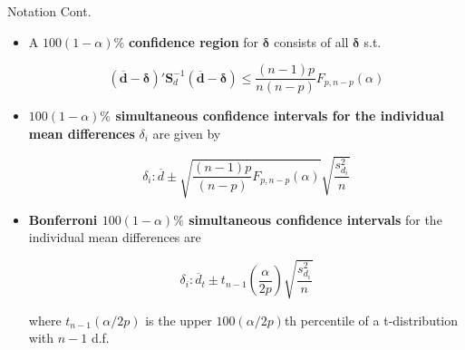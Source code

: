 \documentclass[8pt]{beamer}
\begin{document}
    \begin{frame}{Notation Cont.}
        
        \begin{itemize}
            \item A $100(1 - \alpha)\%$ \textbf{confidence region} for $\mathbf{\delta}$ consists of all $\mathbf{\delta}$ s.t.
            
            \begin{equation}
                (\mathbf{\overline{d}} - \mathbf{\delta})'\mathbf{S}^{-1}_{d}(\overline{\mathbf{d}} - \mathbf{\delta}) \leq \frac{(n - 1)p}{n(n-p)}F_{p,n-p}(\alpha)
            \end{equation}
        
            \item \textbf{$100(1 - \alpha)\%$ simultaneous confidence intervals for the individual mean differences} $\delta_{i}$ are given by
            
            \begin{equation}
                \delta_{i}:\overline{d}\pm\sqrt{\frac{(n-1)p}{(n - p)} F_{p,n-p}(\alpha)}\sqrt{\frac{s^{2}_{d_{i}}}{n}}
            \end{equation}
        
            \item \textbf{Bonferroni $100(1 - \alpha)\%$ simultaneous confidence intervals} for the individual mean differences are 
            
            \begin{equation}
                \delta_{i}: \overline{d}_{t} \pm t_{n-1}\left(\frac{\alpha}{2p}\right)\sqrt{\frac{s^{2}_{d_{i}}}{n}}
            \end{equation}
            
            where $t_{n-1}(\alpha/2p)$ is the upper $100(\alpha/2p)$th percentile of a t-distribution with $n-1$ d.f.
        \end{itemize}
        
        
    \end{frame}




\end{document}
